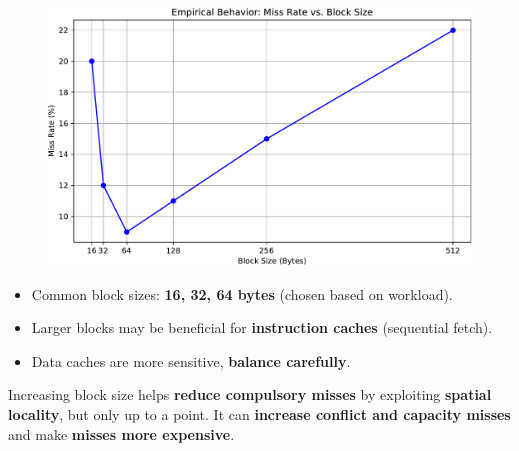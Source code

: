 \begin{figure}[!htp]
    \centering
    \includegraphics[width=\textwidth]{img/miss-rate-vs-block-size.pdf}
\end{figure}

\begin{itemize}
    \item Common block sizes: \textbf{16, 32, 64 bytes} (chosen based on workload).
    \item Larger blocks may be beneficial for \textbf{instruction caches} (sequential fetch).
    \item Data caches are more sensitive, \textbf{balance carefully}.
\end{itemize}
Increasing block size helps \textcolor{Green3}{ \textbf{reduce compulsory misses}} by exploiting \textbf{spatial locality}, but only up to a point. It can \textcolor{Red2}{ \textbf{increase conflict and capacity misses}} and make \textcolor{Red2}{ \textbf{misses more expensive}}.